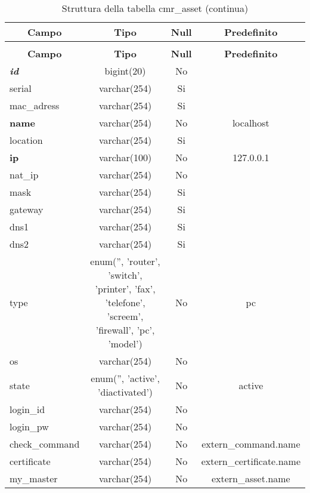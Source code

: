 %
%
 \begin{longtable}{|l|c|c|c|} 
 \caption{Struttura della tabella cmr\_asset} \label{tab:cmr_asset-structure} \\
 \hline \multicolumn{1}{|c|}{\textbf{Campo}} & \multicolumn{1}{|c|}{\textbf{Tipo}} & \multicolumn{1}{|c|}{\textbf{Null}} & \multicolumn{1}{|c|}{\textbf{Predefinito}} \\ \hline \hline
\endfirsthead
 \caption{Struttura della tabella cmr\_asset (continua)} \\ 
 \hline \multicolumn{1}{|c|}{\textbf{Campo}} & \multicolumn{1}{|c|}{\textbf{Tipo}} & \multicolumn{1}{|c|}{\textbf{Null}} & \multicolumn{1}{|c|}{\textbf{Predefinito}} \\ \hline \hline \endhead \endfoot \textbf{\textit{id}} & bigint(20) &  No  &  \\ \hline 
serial & varchar(254) &  Si  &  \\ \hline 
mac\_adress & varchar(254) &  Si  &  \\ \hline 
\textbf{name} & varchar(254) &  No  & localhost \\ \hline 
location & varchar(254) &  Si  &  \\ \hline 
\textbf{ip} & varchar(100) &  No  & 127.0.0.1 \\ \hline 
nat\_ip & varchar(254) &  No  &  \\ \hline 
mask & varchar(254) &  Si  &  \\ \hline 
gateway & varchar(254) &  Si  &  \\ \hline 
dns1 & varchar(254) &  Si  &  \\ \hline 
dns2 & varchar(254) &  Si  &  \\ \hline 
type & enum('', 'router', 'switch', 'printer', 'fax', 'telefone', 'screem', 'firewall', 'pc', 'model') &  No  & pc \\ \hline 
os & varchar(254) &  No  &  \\ \hline 
state & enum('', 'active', 'diactivated') &  No  & active \\ \hline 
login\_id & varchar(254) &  No  &  \\ \hline 
login\_pw & varchar(254) &  No  &  \\ \hline 
check\_command & varchar(254) &  No  & extern\_command.name \\ \hline 
certificate & varchar(254) &  No  & extern\_certificate.name \\ \hline 
my\_master & varchar(254) &  No  & extern\_asset.name \\ \hline 

\end{longtable}

